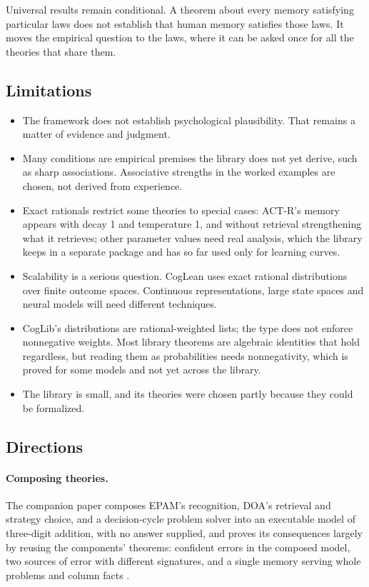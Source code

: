 \documentclass[11pt]{article}
\begin{document}
Universal results remain conditional. A theorem about every memory satisfying particular laws does not establish that human memory satisfies those laws. It moves the empirical question to the laws, where it can be asked once for all the theories that share them.

\subsection{Limitations}

\begin{itemize}
  \item The framework does not establish psychological plausibility. That remains a matter of evidence and judgment.
  \item Many conditions are empirical premises the library does not yet derive, such as sharp associations. Associative strengths in the worked examples are chosen, not derived from experience.
  \item Exact rationals restrict some theories to special cases: ACT-R's memory appears with decay 1 and temperature 1, and without retrieval strengthening what it retrieves; other parameter values need real analysis, which the library keeps in a separate package and has so far used only for learning curves.
  \item Scalability is a serious question. CogLean uses exact rational distributions over finite outcome spaces. Continuous representations, large state spaces and neural models will need different techniques.
  \item CogLib's distributions are rational-weighted lists; the type does not enforce nonnegative weights. Most library theorems are algebraic identities that hold regardless, but reading them as probabilities needs nonnegativity, which is proved for some models and not yet across the library.
  \item The library is small, and its theories were chosen partly because they could be formalized.
\end{itemize}

\subsection{Directions}
\label{sec:directions}

\paragraph{Composing theories.} The companion paper composes EPAM's recognition, DOA's retrieval and strategy choice, and a decision-cycle problem solver into an executable model of three-digit addition, with no answer supplied, and proves its consequences largely by reusing the components' theorems: confident errors in the composed model, two sources of error with different signatures, and a single memory serving whole problems and column facts \citep{shrager2026multidigit}.
\end{document}
